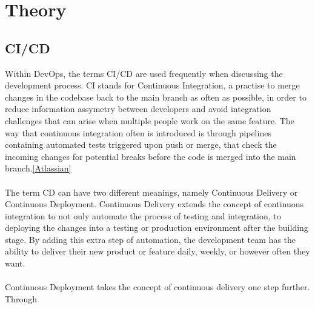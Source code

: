 \section{Theory}
  \subsection{CI/CD}
    Within DevOps, the terms CI/CD are used frequently when discussing the development process. CI stands for Continuous Integration, a practise to merge changes in the codebase back to the main branch as often as possible, in order to reduce information assymetry between developers and avoid integration challenges that can arise when multiple people work on the same feature. The way that continuous integration often is introduced is through pipelines containing automated tests triggered upon push or merge, that check the incoming changes for potential breaks before the code is merged into the main branch.\ref{Atlassian}

  \paragraph{}
    The term CD can have two different meanings, namely Continuous Delivery or Continuous Deployment. Continuous Delivery extends the concept of continuous integration to not only automate the process of testing and integration, to deploying the changes into a testing or production environment after the building stage. By adding this extra step of automation, the development team has the ability to deliver their new product or feature daily, weekly, or however often they want. 
  
  \paragraph{}
    Continuous Deployment takes the concept of continuous delivery one step further. Through 